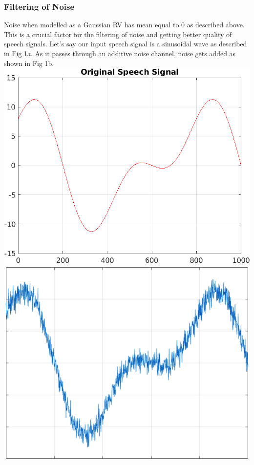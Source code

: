 \documentclass[10pt,twocolumn,letterpaper]{article}
\begin{document}
\subsubsection{Filtering of Noise}
Noise when modelled as a Gaussian RV has mean equal to 0 as described above. This is a crucial factor for the filtering of noise and getting better quality of speech signals. Let's say our input speech signal is a sinusoidal wave as described in Fig 1a. As it passes through an additive noise channel, noise gets added as shown in Fig 1b. \\

\includegraphics[scale=0.17]{original.png}
\hspace{0.4cm}\includegraphics[scale=0.17]{noisy.png}
\end{document}
